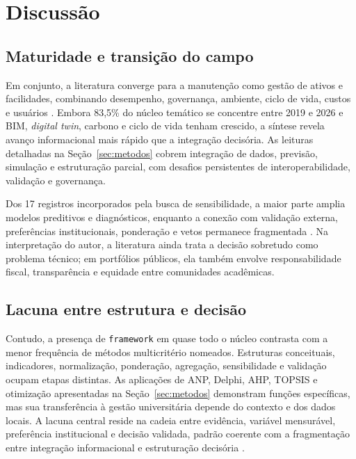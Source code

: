 \section{Discussão}
\label{sec:discussao}

\subsection{Maturidade e transição do campo}

Em conjunto, a literatura converge para a manutenção como gestão de ativos e facilidades, combinando desempenho, governança, ambiente, ciclo de vida, custos e usuários \parencite{nielsen_sustentabilidadefm_2016,opoku_futurofm_2022,okoro_sustainablefm_2023}. Embora 83,5\% do núcleo temático se concentre entre 2019 e 2026 e BIM, \textit{digital twin}, carbono e ciclo de vida tenham crescido, a síntese revela avanço informacional mais rápido que a integração decisória. As leituras detalhadas na Seção~\ref{sec:metodos} cobrem integração de dados, previsão, simulação e estruturação parcial, com desafios persistentes de interoperabilidade, validação e governança.

Dos 17 registros incorporados pela busca de sensibilidade, a maior parte amplia modelos preditivos e diagnósticos, enquanto a conexão com validação externa, preferências institucionais, ponderação e vetos permanece fragmentada \parencite{das_iotai_2025,alfalah_frameworkeducacional_2022}. Na interpretação do autor, a literatura ainda trata a decisão sobretudo como problema técnico; em portfólios públicos, ela também envolve responsabilidade fiscal, transparência e equidade entre comunidades acadêmicas.

\subsection{Lacuna entre estrutura e decisão}

Contudo, a presença de \texttt{framework} em quase todo o núcleo contrasta com a menor frequência de métodos multicritério nomeados. Estruturas conceituais, indicadores, normalização, ponderação, agregação, sensibilidade e validação ocupam etapas distintas. As aplicações de ANP, Delphi, AHP, TOPSIS e otimização apresentadas na Seção~\ref{sec:metodos} demonstram funções específicas, mas sua transferência à gestão universitária depende do contexto e dos dados locais. A lacuna central reside na cadeia entre evidência, variável mensurável, preferência institucional e decisão validada, padrão coerente com a fragmentação entre integração informacional e estruturação decisória \parencite{deng_bimdigitaltwins_2021,das_iotai_2025}.

